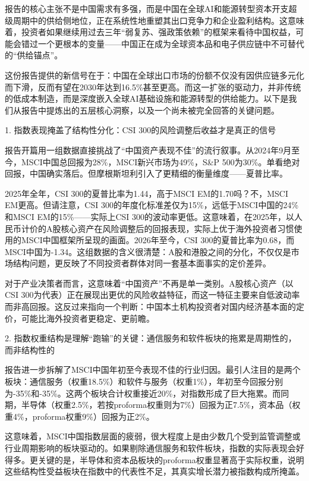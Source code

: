 \documentclass[11pt]{ctexart}
\begin{document}
报告的核心主张不是中国需求有多强，而是中国在全球AI和能源转型资本开支超级周期中的供给侧地位，正在系统性地重塑其出口竞争力和企业盈利结构。这意味着，投资者如果继续用过去三年“弱复苏、强政策依赖”的框架来看待中国权益，可能会错过一个更根本的变量——中国正在成为全球资本品和电子供应链中不可替代的“供给锚点”。

这份报告提供的新信号在于：中国在全球出口市场的份额不仅没有因供应链多元化而下滑，反而有望在2030年达到16.5\%甚至更高。而这一扩张的驱动力，并非传统的低成本制造，而是深度嵌入全球AI基础设施和能源转型的供给能力。以下是我们从报告中提炼出的五层核心洞察，以及一个尚未被完全回答的关键问题。

1. 指数表现掩盖了结构性分化：CSI 300的风险调整后收益才是真正的信号

报告开篇用一组数据直接挑战了“中国资产表现不佳”的流行叙事。从2024年9月至今，MSCI中国总回报为28\%，MSCI新兴市场为49\%，S\&P 500为30\%。单看绝对回报，中国确实落后。但摩根斯坦利引入了更精细的衡量维度——夏普比率。

2025年全年，CSI 300的夏普比率为1.44，高于MSCI EM的1.70吗？不，MSCI EM更高。但请注意，CSI 300的年度化标准差仅为15\%，远低于MSCI中国的24\%和MSCI EM的15\%——实际上CSI 300的波动率更低。这意味着，在2025年，以人民币计价的A股核心资产在风险调整后的回报表现，实际上优于海外投资者习惯使用的MSCI中国框架所呈现的画面。2026年至今，CSI 300的夏普比率为0.68，而MSCI中国为-1.34。这组数据的含义很清楚：A股和港股之间的分化，不仅仅是市场结构问题，更反映了不同投资者群体对同一套基本面事实的定价差异。

对于产业决策者而言，这意味着“中国资产”不再是单一类别。A股核心资产（以CSI 300为代表）正在展现出更优的风险收益特征，而这一特征主要来自低波动率而非高回报。这反过来指向一个判断：中国本土机构投资者对国内经济基本面的定价，可能比海外投资者更稳定、更前瞻。

2. 指数权重结构是理解“跑输”的关键：通信服务和软件板块的拖累是周期性的，而非结构性的

报告进一步拆解了MSCI中国年初至今表现不佳的行业归因。最引人注目的是两个板块：通信服务（权重18.5\%）和软件与服务（权重1\%），年初至今回报分别为-35\%和-35\%。这两个板块合计权重接近20\%，对指数形成了巨大拖累。而同期，半导体（权重2.5\%，若按proforma权重则为7\%）回报为正7.5\%，资本品（权重4\%，proforma权重9\%）回报为正2\%。

这意味着，MSCI中国指数层面的疲弱，很大程度上是由少数几个受到监管调整或行业周期影响的板块驱动的。如果剔除通信服务和软件板块，指数的实际表现会好得多。更关键的是，半导体和资本品板块的proforma权重显著高于实际权重，说明这些结构性受益板块在指数中的代表性不足，其真实增长潜力被指数构成所掩盖。
\end{document}
